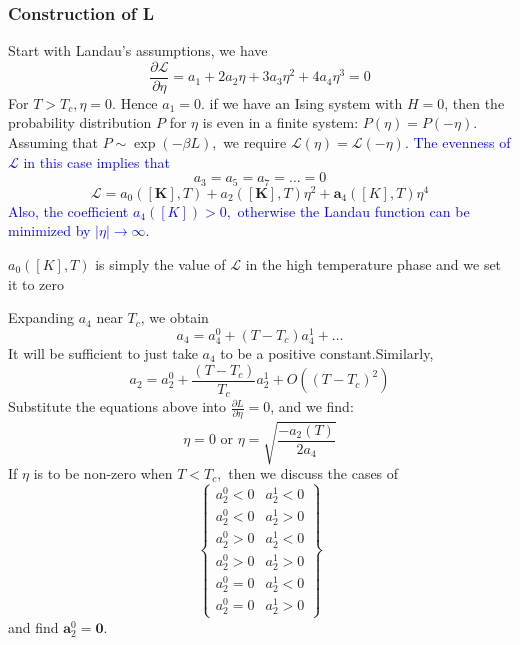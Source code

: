 \documentclass[12pt,titlepage]{article}
\newcommand{\bluep}[1]{\textcolor{blue}{#1}}
\numberwithin{equation}{section}
\begin{document}
\subsubsection{Construction of L}
Start with Landau's assumptions, we have
\begin{equation}
\frac{\partial \mathcal{L}}{\partial \eta}=a_{1}+2 a_{2} \eta+3 a_{3} \eta^{2}+4 a_{4} \eta^{3}=0
\end{equation}
For $T>T_{c}, \eta=0 .$ Hence $a_{1}=0$. if we have an Ising system with $H=0$, then the probability distribution $P$ for $\eta$ is even in a finite system: $P(\eta)=P(-\eta)$. Assuming that $P \sim \exp (-\beta L),$ we require $\mathcal{L}(\eta)=\mathcal{L}(-\eta)$. \bluep{The evenness of $\mathcal{L}$ in this case implies that}
\begin{equation}
a_{3}=a_{5}=a_{7}=\dots=0
\end{equation}
\begin{equation}
\label{phenomenological_landau}
\mathcal{L}=a_{0}([\boldsymbol{K}], T)+a_{2}([\boldsymbol{K}], T) \eta^{2}+\boldsymbol{a}_{4}([K], T) \eta^{4}
\end{equation}
\bluep{Also, the coefficient $a_{4}([K])>0,$ otherwise the Landau function can be minimized by $|\eta| \rightarrow \infty$}.

$a_{0}([K], T)$ is simply the value of $\mathcal{L}$ in the high temperature phase and we set it to zero

Expanding $a_4$ near $T_c$, we obtain
\begin{equation}
a_{4}=a_{4}^{0}+\left(T-T_{c}\right) a_{4}^{1}+\dots
\end{equation}
It will be sufficient to just take $a_4$ to be a positive constant.Similarly, 
\begin{equation}
a_{2}=a_{2}^{0}+\frac{\left(T-T_{c}\right)}{T_{c}} a_{2}^{1}+O\left(\left(T-T_{c}\right)^{2}\right)
\end{equation}
Substitute the equations above into $\frac{\partial L}{\partial \eta}=0$, and we find:
\begin{equation}
\eta=0 \text { or } \eta=\sqrt{\frac{-a_{2}(T)}{2 a_{4}}}
\end{equation}
If $\eta$ is to be non-zero when $T<T_{c},$ then we discuss the cases of 
\begin{equation}
    \begin{Bmatrix}
a^{0}_{2} < 0 & a^{1}_{2} < 0\\
a^{0}_{2} < 0 & a^{1}_{2}  >0\\
a^{0}_{2}  >0 & a^{1}_{2} < 0\\
a^{0}_{2}  >0 & a^{1}_{2}  >0\\
a^{0}_{2} =0 & a^{1}_{2} < 0\\
a^{0}_{2} =0 & a^{1}_{2}  >0
\end{Bmatrix}
\end{equation}
and find $\boldsymbol{a}_{2}^{0}=\boldsymbol{0}$.
\end{document}

